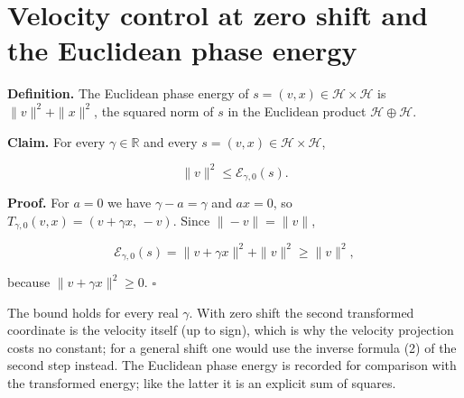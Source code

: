 \documentclass[11pt,a4paper]{article}
\begin{document}
\section{\texorpdfstring{Velocity control at zero shift and the Euclidean phase energy}{Velocity control at zero shift and the Euclidean phase energy}}


\textbf{Definition.} The Euclidean phase energy of \(s=(v,x)\in \mathcal H\times \mathcal H\) is \(\|v\|^2+\|x\|^2\), the squared norm of \(s\) in the Euclidean product \(\mathcal H\oplus \mathcal H\).




\textbf{Claim.} For every \(\gamma\in\mathbb R\) and every \(s=(v,x)\in \mathcal H\times \mathcal H\),


\[\|v\|^2\le\mathcal E_{\gamma,0}(s).\]


\textbf{Proof.} For \(a=0\) we have \(\gamma-a=\gamma\) and \(ax=0\), so \(T_{\gamma,0}(v,x)=(v+\gamma x,\,-v)\). Since \(\|-v\|=\|v\|\),


\[\mathcal E_{\gamma,0}(s)=\|v+\gamma x\|^2+\|v\|^2\ge\|v\|^2,\]


because \(\|v+\gamma x\|^2\ge0\). \(\square\)




The bound holds for every real \(\gamma\). With zero shift the second transformed coordinate is the velocity itself (up to sign), which is why the velocity projection costs no constant; for a general shift one would use the inverse formula (2) of the second step instead. The Euclidean phase energy is recorded for comparison with the transformed energy; like the latter it is an explicit sum of squares.
\end{document}
